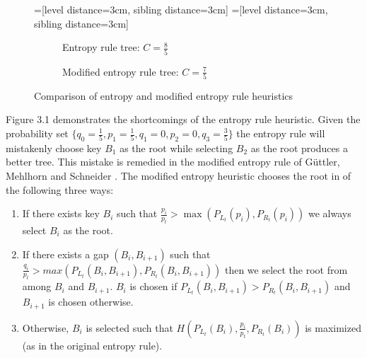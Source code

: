 \documentclass[letterpaper,12pt,titlepage,oneside,final]{book}
\theoremstyle{plain}
\begin{document}
\begin{figure}[H]
\centering
=[level distance=3cm, sibling distance=3cm]
=[level distance=3cm, sibling distance=3cm]
\scriptsize
\begin{subfigure}{.46\textwidth}
\centering
{}
\caption{Entropy rule tree: $C=\frac{8}{5}$}
\end{subfigure}
\begin{subfigure}{.46\textwidth}
\centering
{}
\caption{Modified entropy rule tree: $C=\frac{7}{5}$}
\end{subfigure}
\caption{Comparison of entropy and modified entropy rule heuristics}
\end{figure}

Figure 3.1 demonstrates the shortcomings of the entropy rule heuristic. Given the probability set $\{q_0 = \frac{1}{5}, p_1 = \frac{1}{5}, q_1 = 0, p_2 = 0, q_3 = \frac{3}{5}\}$ the entropy rule will mistakenly choose key $B_1$ as the root while selecting $B_2$ as the root produces a better tree. This mistake is remedied in the modified entropy rule of G{\"u}ttler, Mehlhorn and Schneider \cite{guttler1980binary}. The modified entropy heuristic chooses the root in of the following three ways:

\begin{enumerate}[label=\alph*)]
\item If there exists key $B_i$ such that $\frac{p_i}{p_t} > \max(P_{L_t}(p_i), P_{R_t}(p_i))$ we always select $B_i$ as the root.

\item If there exists a gap $(B_i, B_{i+1})$ such that $\frac{q_i}{p_t} > max(P_{L_t}(B_i, B_{i+1}), P_{R_t}(B_i, B_{i+1}))$ then we select the root from among $B_i$ and $B_{i+1}$. $B_i$ is chosen if $P_{L_t}(B_i, B_{i+1}) > P_{R_t}(B_i, B_{i+1})$ and $B_{i+1}$ is chosen otherwise.

\item Otherwise, $B_i$ is selected such that $H(P_{L_t}(B_i), \frac{p_i}{p_t}, P_{R_t}(B_i))$ is maximized (as in the original entropy rule).

\end{enumerate}
\end{document}
